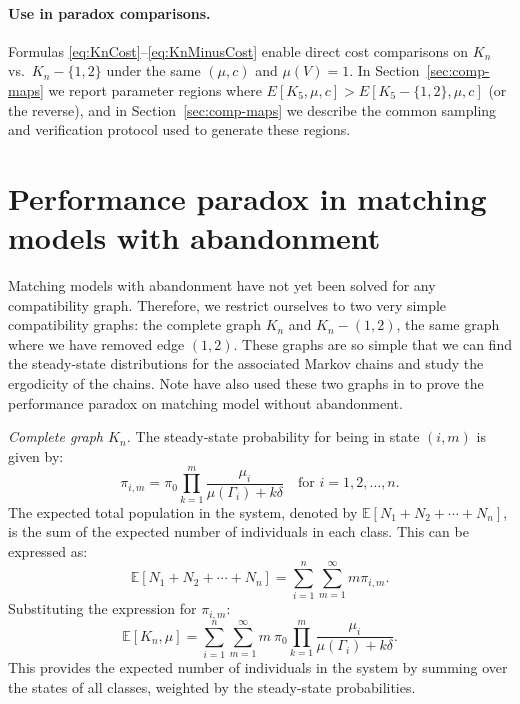 \documentclass[11pt]{article}
\begin{document}
{\paragraph{Use in paradox comparisons.}
Formulas \eqref{eq:KnCost}–\eqref{eq:KnMinusCost} enable direct cost comparisons on $K_n$ vs.\ $K_n-\{1,2\}$ under the same $(\mu,c)$ and $\mu(V)=1$. In Section~\ref{sec:comp-maps} we report parameter regions where $E[K_5,\mu,c]>E[K_5-\{1,2\},\mu,c]$ (or the reverse), and in Section~\ref{sec:comp-maps} we describe the common sampling and verification protocol used to generate these regions.

\section{Performance paradox in matching models with abandonment}\label{sec:abandon}

Matching models with abandonment have not yet been solved for any compatibility graph. 
Therefore, we restrict ourselves to two very simple compatibility graphs: the complete graph $K_n$ and $K_n - (1,2)$, the same graph where we have removed edge $(1,2)$. 
These graphs are so simple that we can find the steady-state distributions for the associated Markov chains and study the 
ergodicity of the chains. 
Note have also used these two graphs in \cite{CDFB21} to prove the performance paradox on matching model without abandonment. 

\emph{Complete graph \(K_n\).} The steady-state probability for being in state $(i,m)$ is given by:
\begin{equation}
\pi_{i,m} = \pi_0\prod_{k=1}^{m} \frac{\mu_i}{\mu(\Gamma_i) + k \delta} \quad \text{for } i=1, 2, \dots, n.
\end{equation}
The expected total population in the system, denoted by $\mathbb{E}[N_1 + N_2 + \cdots + N_n]$, is the sum of the expected number of individuals in each class. 
This can be expressed as:
\begin{equation}
\mathbb{E}[N_1 + N_2 + \cdots + N_n] = \sum_{i=1}^{n} \sum_{m=1}^{\infty} m \pi_{i,m}.
\end{equation}
Substituting the expression for $\pi_{i,m}$:
\begin{equation}
\mathbb{E}[K_n, \mu] = \sum_{i=1}^{n} \sum_{m=1}^{\infty} m~ \pi_0\prod_{k=1}^{m} \frac{\mu_i}{\mu(\Gamma_i) + k \delta}.
\end{equation}
This provides the expected number of individuals in the system by summing over the states of all classes, weighted by the steady-state probabilities.

}
\end{document}

